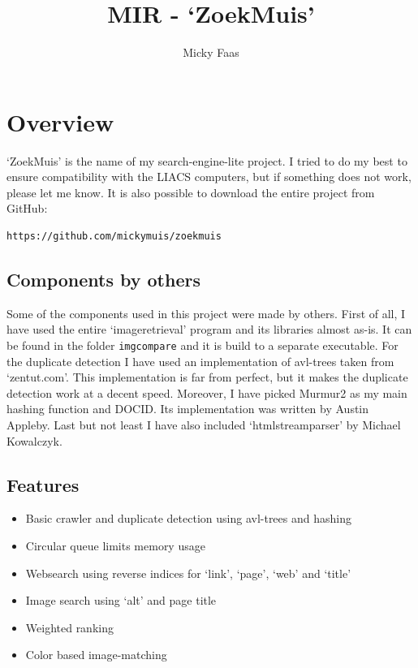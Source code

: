 \documentclass[10pt,a4paper]{article}
\author{Micky Faas}
\title{MIR - `ZoekMuis'}
\begin{document}
\maketitle

\section{Overview}

`ZoekMuis' is the name of my search-engine-lite project. I tried to do my best to ensure compatibility with the LIACS computers, but if something does not work, please let me know. It is also possible to download the entire project from GitHub:
\begin{verbatim}
https://github.com/mickymuis/zoekmuis
\end{verbatim}
\subsection{Components by others}

Some of the components used in this project were made by others. First of all, I have used the entire `imageretrieval' program and its libraries almost as-is. It can be found in the folder \texttt{imgcompare} and it is build to a separate executable. For the duplicate detection I have used an implementation of avl-trees taken from `zentut.com'. This implementation is far from perfect, but it makes the duplicate detection work at a decent speed. Moreover, I have picked Murmur2 as my main hashing function and DOCID. Its implementation was written by Austin Appleby. Last but not least I have also included  `htmlstreamparser' by Michael Kowalczyk.

\subsection{Features}

\begin{itemize}
\item Basic crawler and duplicate detection using avl-trees and hashing
\item Circular queue limits memory usage
\item Websearch using reverse indices for `link', `page', `web' and `title'
\item Image search using `alt' and page title
\item Weighted ranking
\item Color based image-matching
\end{itemize}
\end{document}
